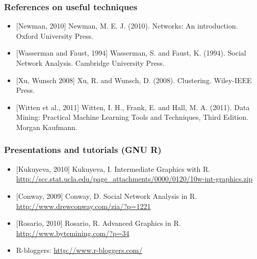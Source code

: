 
\begin{frame}
\frametitle{References on useful techniques}

\begin{itemize}
 \item \small [Newman, 2010] Newman, M. E. J. (2010). Networks: An introduction. Oxford University Press.
 \item \small [Wasserman and Faust, 1994] Wasserman, S. and Faust, K. (1994). Social Network Analysis.
Cambridge University Press.
 \item \small [Xu, Wunsch 2008] Xu, R. and Wunsch, D. (2008). Clustering. Wiley-IEEE Press.
 \item \small [Witten et al., 2011] Witten, I. H., Frank, E. and Hall, M. A. (2011). Data Mining: Practical Machine 
Learning Tools and Techniques, Third Edition. Morgan Kaufmann.

 \end{itemize}
\end{frame}


\begin{frame}
\frametitle{Presentations and tutorials (GNU R)}

\begin{itemize}
 \item \small [Kukuyeva, 2010] Kukuyeva, I. Intermediate Graphics with R.
 \url{http://scc.stat.ucla.edu/page_attachments/0000/0120/10w-int-graphics.zip}
 \item \small [Conway, 2009] Conway, D. Social Network Analysis in R.
 \url{http://www.drewconway.com/zia/?p=1221}
 \item \small [Rosario, 2010] Rosario, R. Advanced Graphics in R.
 \url{http://www.bytemining.com/?p=34}
 \item R-bloggers: \url{http://www.r-bloggers.com/}

 \end{itemize}
\end{frame}


